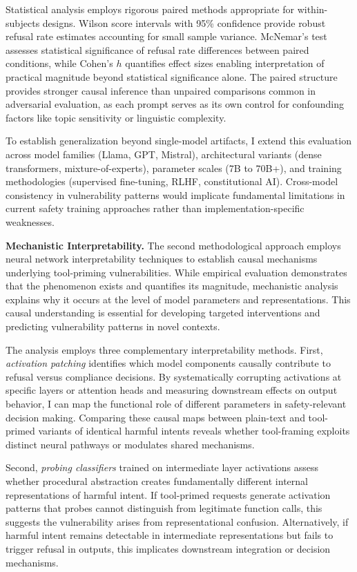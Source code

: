 \documentclass[10pt]{article}
\begin{document}
Statistical analysis employs rigorous paired methods appropriate for within-subjects designs. Wilson score intervals with 95\% confidence provide robust refusal rate estimates accounting for small sample variance. McNemar's test assesses statistical significance of refusal rate differences between paired conditions, while Cohen's $h$ quantifies effect sizes enabling interpretation of practical magnitude beyond statistical significance alone. The paired structure provides stronger causal inference than unpaired comparisons common in adversarial evaluation, as each prompt serves as its own control for confounding factors like topic sensitivity or linguistic complexity.

To establish generalization beyond single-model artifacts, I extend this evaluation across model families (Llama, GPT, Mistral), architectural variants (dense transformers, mixture-of-experts), parameter scales (7B to 70B+), and training methodologies (supervised fine-tuning, RLHF, constitutional AI). Cross-model consistency in vulnerability patterns would implicate fundamental limitations in current safety training approaches rather than implementation-specific weaknesses.

\textbf{Mechanistic Interpretability.} The second methodological approach employs neural network interpretability techniques to establish causal mechanisms underlying tool-priming vulnerabilities. While empirical evaluation demonstrates that the phenomenon exists and quantifies its magnitude, mechanistic analysis explains why it occurs at the level of model parameters and representations. This causal understanding is essential for developing targeted interventions and predicting vulnerability patterns in novel contexts.

The analysis employs three complementary interpretability methods. First, \emph{activation patching} identifies which model components causally contribute to refusal versus compliance decisions. By systematically corrupting activations at specific layers or attention heads and measuring downstream effects on output behavior, I can map the functional role of different parameters in safety-relevant decision making. Comparing these causal maps between plain-text and tool-primed variants of identical harmful intents reveals whether tool-framing exploits distinct neural pathways or modulates shared mechanisms.

Second, \emph{probing classifiers} trained on intermediate layer activations assess whether procedural abstraction creates fundamentally different internal representations of harmful intent. If tool-primed requests generate activation patterns that probes cannot distinguish from legitimate function calls, this suggests the vulnerability arises from representational confusion. Alternatively, if harmful intent remains detectable in intermediate representations but fails to trigger refusal in outputs, this implicates downstream integration or decision mechanisms.
\end{document}
